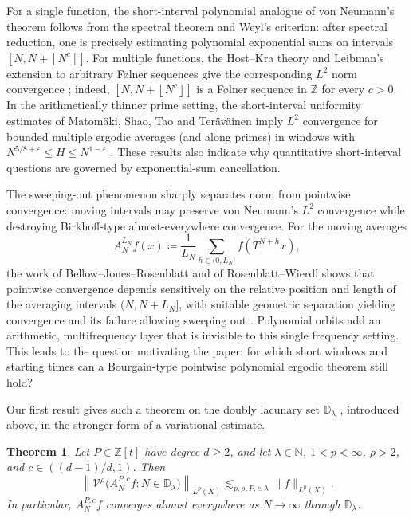 \documentclass[12pt,leqno]{amsart}
\def\N {\mathbb{N}}
\newcounter{counter}
\newcounter{counter2}
\numberwithin{equation}{section}
\numberwithin{counter2}{section}
\newtheorem{theorem}[counter]{Theorem}
\newcounter{theorem}
\theoremstyle{definition}
\theoremstyle{plain}
\newcommand{\floor}[1]{\left\lfloor #1 \right\rfloor}
\begin{document}
For a single function,
the short-interval polynomial analogue of von Neumann's theorem follows from
the spectral theorem and Weyl's criterion: after spectral reduction, one is
precisely estimating polynomial exponential sums on intervals
$[N,N+\floor{N^c}]$.  For multiple functions, the Host--Kra theory and Leibman's
extension to arbitrary F{\o}lner sequences give the corresponding $L^2$ norm
convergence \cite{HostKra2005,LeibmanFolner2005}; indeed,
$[N,N+\floor{N^c}]$ is a F{\o}lner sequence in $\mathbb Z$ for every $c>0$.  In the
arithmetically thinner prime setting, the short-interval uniformity estimates
of Matom\"aki, Shao, Tao and Ter\"av\"ainen imply $L^2$ convergence for bounded
multiple ergodic averages (and along primes) in windows with
$N^{5/8+\varepsilon}\leq H\leq N^{1-\varepsilon}$
\cite{MatomakiShaoTaoTeravainen2023}.  These results also indicate why
quantitative short-interval questions are governed by exponential-sum
cancellation. 


The sweeping-out phenomenon sharply separates norm from pointwise convergence: moving intervals may preserve von Neumann's $L^2$ convergence while destroying Birkhoff-type almost-everywhere convergence. For the moving averages
\[
A_{N}^{L_N} f(x) \coloneqq \frac{1}{L_N}\sum_{h \in (0,L_N]} f(T^{N+h} x),
\]
the work of Bellow--Jones--Rosenblatt and of Rosenblatt--Wierdl shows that pointwise convergence depends sensitively on the relative position and length of the averaging intervals $(N,N+L_N]$, with suitable geometric separation yielding convergence and its failure allowing sweeping out \cite{BJR_90_moving_avgs,Rosenblatt_Wierdl_ergodic_95}.
 Polynomial orbits add
an arithmetic, multifrequency layer that is invisible to this single frequency
setting.  This leads to the question motivating the paper: for which short
windows and starting times can a Bourgain-type pointwise polynomial ergodic
theorem still hold?

Our first result gives such a theorem on the doubly lacunary set
$\mathbb D_\lambda$ ,  introduced above, in the stronger form of a variational estimate.

\begin{theorem}\label{t:short-variation}
	Let $P\in\mathbb Z[t]$ have degree $d\geq2$, and let $\lambda \in \N$,
	$1<p<\infty$, $\rho>2$, and $c\in((d-1)/d,1)$.  Then
	\[
	\left\|\mathcal V^\rho
	\bigl(A_N^{P,c}f:N\in\mathbb D_\lambda\bigr)
	\right\|_{L^p(X)}
	\lesssim_{p,\rho,P,c,\lambda}\|f\|_{L^p(X)}.
	\]
	In particular, $A_N^{P,c}f$ converges almost everywhere as
	$N\to\infty$ through $\mathbb D_\lambda$.
\end{theorem}
\end{document}
